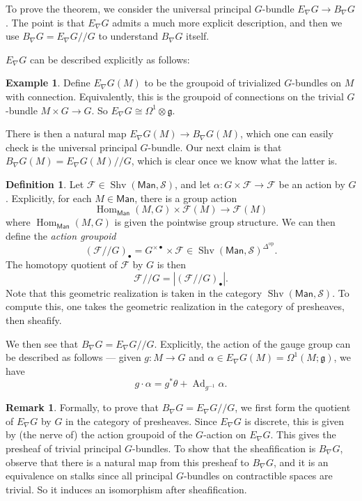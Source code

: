 \documentclass{shortart}
\theoremstyle{definition}
\newtheorem{defi}[thm]{Definition}
\newtheorem{remark}[thm]{Remark}
\newtheorem{eg}[thm]{Example}
\DeclareMathOperator\Shv{Shv}
\DeclareMathOperator\Hom{Hom}
\DeclareMathOperator\Ad{Ad}
\newcommand\Man{\mathsf{Man}}
\newcommand\op{\mathrm{op}}
\newcommand\modmod{/\!/}
\renewcommand\S{\mathcal{S}}
\begin{document}
To prove the theorem, we consider the universal principal $G$-bundle $E_\nabla G \to B_\nabla G$. The point is that $E_\nabla G$ admits a much more explicit description, and then we use $B_\nabla G = E_\nabla G \modmod G$ to understand $B_\nabla G$ itself.

$E_\nabla G$ can be described explicitly as follows:

\begin{eg}
  Define $E_\nabla G (M)$ to be the groupoid of trivialized $G$-bundles on $M$ with connection. Equivalently, this is the groupoid of connections on the trivial $G$-bundle $M \times G \to G$. So $E_\nabla G \cong \Omega^1 \otimes \mathfrak{g}$.
\end{eg}

There is then a natural map $E_\nabla G(M) \to B_\nabla G(M)$, which one can easily check is the universal principal $G$-bundle. Our next claim is that $B_\nabla G(M) = E_\nabla G(M) \modmod G$, which is clear once we know what the latter is.

\begin{defi}
  Let $\mathcal{F} \in \Shv(\Man, \S)$, and let $\alpha : G \times \mathcal{F} \to \mathcal{F}$ be an action by $G$. Explicitly, for each $M \in \Man$, there is a group action
  \[
    \Hom_{\Man}(M, G) \times \mathcal{F}(M) \to \mathcal{F}(M)
  \]
  where $\Hom_{\Man}(M, G)$ is given the pointwise group structure. We can then define the \emph{action groupoid}
  \[
    (\mathcal{F}\modmod G)_\bullet = G^{\times \bullet} \times \mathcal{F} \in \Shv(\Man, \S)^{\Delta^\op}.
  \]
  The homotopy quotient of $\mathcal{F}$ by $G$ is then
  \[
    \mathcal{F}\modmod G = |(\mathcal{F}\modmod G)_\bullet|.
  \]
  Note that this geometric realization is taken in the category $\Shv(\Man, \S)$. To compute this, one takes the geometric realization in the category of presheaves, then sheafify.
\end{defi}
We then see that $B_\nabla G = E_\nabla G \modmod G$. Explicitly, the action of the gauge group can be described as follows --- given $g: M \to G$ and $\alpha \in E_\nabla G(M) = \Omega^1(M; \mathfrak{g})$, we have
\[
  g \cdot \alpha = g^* \theta + \Ad_{g^{-1}} \alpha.
\]

\begin{remark}
  Formally, to prove that $B_\nabla G = E_\nabla G \modmod G$, we first form the quotient of $E_\nabla G$ by $G$ in the category of presheaves. Since $E_\nabla G$ is discrete, this is given by (the nerve of) the action groupoid of the $G$-action on $E_\nabla G$. This gives the presheaf of trivial principal $G$-bundles. To show that the sheafification is $B_\nabla G$, observe that there is a natural map from this presheaf to $B_\nabla G$, and it is an equivalence on stalks since all principal $G$-bundles on contractible spaces are trivial. So it induces an isomorphism after sheafification.
\end{remark}
\end{document}
